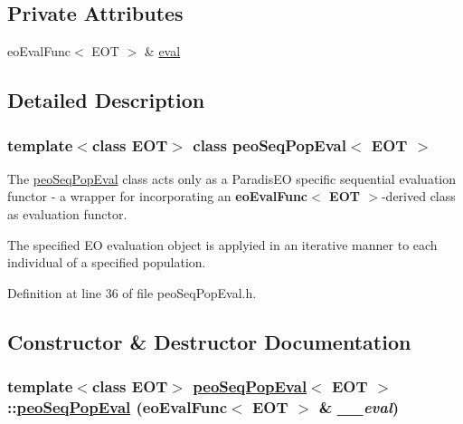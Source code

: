 \subsection*{Private Attributes}
\begin{CompactItemize}
\item 
\hypertarget{classpeoSeqPopEval_5465f31386c6b96bc8f7fb9393a28a2f}{
eo\-Eval\-Func$<$ EOT $>$ \& \hyperlink{classpeoSeqPopEval_5465f31386c6b96bc8f7fb9393a28a2f}{eval}}
\label{classpeoSeqPopEval_5465f31386c6b96bc8f7fb9393a28a2f}

\end{CompactItemize}


\subsection{Detailed Description}
\subsubsection*{template$<$class EOT$>$ class peo\-Seq\-Pop\-Eval$<$ EOT $>$}

The \hyperlink{classpeoSeqPopEval}{peo\-Seq\-Pop\-Eval} class acts only as a Paradis\-EO specific sequential evaluation functor - a wrapper for incorporating an {\bf eo\-Eval\-Func$<$ EOT $>$}-derived class as evaluation functor. 

The specified EO evaluation object is applyied in an iterative manner to each individual of a specified population. 



Definition at line 36 of file peo\-Seq\-Pop\-Eval.h.

\subsection{Constructor \& Destructor Documentation}
\hypertarget{classpeoSeqPopEval_a41f91ab4b2aeb325ff75feb66d4e003}{
\subsubsection[peoSeqPopEval]{\setlength{\rightskip}{0pt plus 5cm}template$<$class EOT$>$ \hyperlink{classpeoSeqPopEval}{peo\-Seq\-Pop\-Eval}$<$ EOT $>$::\hyperlink{classpeoSeqPopEval}{peo\-Seq\-Pop\-Eval} (eo\-Eval\-Func$<$ EOT $>$ \& {\em \_\-\_\-eval})}}
\label{classpeoSeqPopEval_a41f91ab4b2aeb325ff75feb66d4e003}


